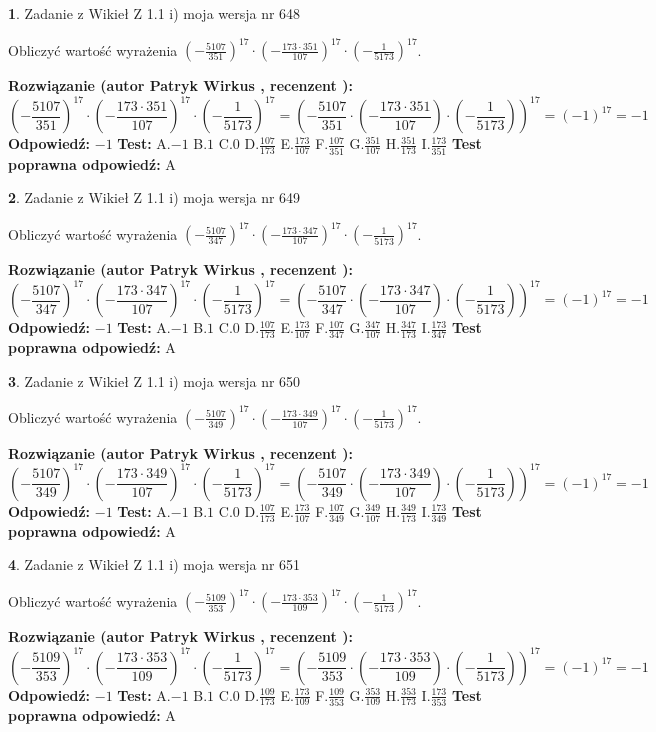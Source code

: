 \documentclass[12pt, a4paper]{article}
\theoremstyle{definition} %
\newtheorem{zad}{}
\newcommand{\zadStart}[1]{\begin{zad}#1\newline}
\newcommand{\zadStop}{\end{zad}}
\newcommand{\rozwStart}[2]{\noindent \textbf{Rozwiązanie (autor #1 , recenzent #2): }\newline}
\newcommand{\rozwStop}{\newline}
\newcommand{\odpStart}{\noindent \textbf{Odpowiedź:}\newline}
\newcommand{\odpStop}{\newline}
\newcommand{\testStart}{\noindent \textbf{Test:}\newline}
\newcommand{\testStop}{\newline}
\newcommand{\kluczStart}{\noindent \textbf{Test poprawna odpowiedź:}\newline}
\newcommand{\kluczStop}{\newline}
\begin{document}
\zadStart{Zadanie z Wikieł Z 1.1 i) moja wersja nr 648}

Obliczyć wartość wyrażenia $(-\frac{5107}{351})^{17} \cdot (-\frac{173 \cdot 351}{107})^{17} \cdot (-\frac{1}{5173})^{17}$.
\zadStop
\rozwStart{Patryk Wirkus}{}
$$(-\frac{5107}{351})^{17} \cdot (-\frac{173 \cdot 351}{107})^{17} \cdot (-\frac{1}{5173})^{17} = (-\frac{5107}{351} \cdot (-\frac{173 \cdot 351}{107}) \cdot (-\frac{1}{5173}))^{17} = (-1)^{17} = -1$$
\rozwStop
\odpStart
$-1$
\odpStop
\testStart
A.$-1$ B.$1$ C.$0$ D.$\frac{107}{173}$ E.$\frac{173}{107}$
F.$\frac{107}{351}$ G.$\frac{351}{107}$
H.$\frac{351}{173}$
I.$\frac{173}{351}$
\testStop
\kluczStart
A
\kluczStop



\zadStart{Zadanie z Wikieł Z 1.1 i) moja wersja nr 649}

Obliczyć wartość wyrażenia $(-\frac{5107}{347})^{17} \cdot (-\frac{173 \cdot 347}{107})^{17} \cdot (-\frac{1}{5173})^{17}$.
\zadStop
\rozwStart{Patryk Wirkus}{}
$$(-\frac{5107}{347})^{17} \cdot (-\frac{173 \cdot 347}{107})^{17} \cdot (-\frac{1}{5173})^{17} = (-\frac{5107}{347} \cdot (-\frac{173 \cdot 347}{107}) \cdot (-\frac{1}{5173}))^{17} = (-1)^{17} = -1$$
\rozwStop
\odpStart
$-1$
\odpStop
\testStart
A.$-1$ B.$1$ C.$0$ D.$\frac{107}{173}$ E.$\frac{173}{107}$
F.$\frac{107}{347}$ G.$\frac{347}{107}$
H.$\frac{347}{173}$
I.$\frac{173}{347}$
\testStop
\kluczStart
A
\kluczStop



\zadStart{Zadanie z Wikieł Z 1.1 i) moja wersja nr 650}

Obliczyć wartość wyrażenia $(-\frac{5107}{349})^{17} \cdot (-\frac{173 \cdot 349}{107})^{17} \cdot (-\frac{1}{5173})^{17}$.
\zadStop
\rozwStart{Patryk Wirkus}{}
$$(-\frac{5107}{349})^{17} \cdot (-\frac{173 \cdot 349}{107})^{17} \cdot (-\frac{1}{5173})^{17} = (-\frac{5107}{349} \cdot (-\frac{173 \cdot 349}{107}) \cdot (-\frac{1}{5173}))^{17} = (-1)^{17} = -1$$
\rozwStop
\odpStart
$-1$
\odpStop
\testStart
A.$-1$ B.$1$ C.$0$ D.$\frac{107}{173}$ E.$\frac{173}{107}$
F.$\frac{107}{349}$ G.$\frac{349}{107}$
H.$\frac{349}{173}$
I.$\frac{173}{349}$
\testStop
\kluczStart
A
\kluczStop



\zadStart{Zadanie z Wikieł Z 1.1 i) moja wersja nr 651}

Obliczyć wartość wyrażenia $(-\frac{5109}{353})^{17} \cdot (-\frac{173 \cdot 353}{109})^{17} \cdot (-\frac{1}{5173})^{17}$.
\zadStop
\rozwStart{Patryk Wirkus}{}
$$(-\frac{5109}{353})^{17} \cdot (-\frac{173 \cdot 353}{109})^{17} \cdot (-\frac{1}{5173})^{17} = (-\frac{5109}{353} \cdot (-\frac{173 \cdot 353}{109}) \cdot (-\frac{1}{5173}))^{17} = (-1)^{17} = -1$$
\rozwStop
\odpStart
$-1$
\odpStop
\testStart
A.$-1$ B.$1$ C.$0$ D.$\frac{109}{173}$ E.$\frac{173}{109}$
F.$\frac{109}{353}$ G.$\frac{353}{109}$
H.$\frac{353}{173}$
I.$\frac{173}{353}$
\testStop
\kluczStart
A
\kluczStop
\end{document}
